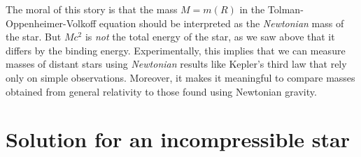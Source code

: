 The moral of this story is that the mass $M = m(R)$ in the Tolman-Oppenheimer-Volkoff equation should be interpreted as the \emph{Newtonian} mass of the star.
But $M c^2$ is \emph{not} the total energy of the star, as we saw above that it differs by the binding energy.
Experimentally, this implies that we can measure masses of distant stars using \emph{Newtonian} results like Kepler's third law that rely only on simple observations.
Moreover, it makes it meaningful to compare masses obtained from general relativity to those found using Newtonian gravity.
\section{Solution for an incompressible star}
\label{sec:incompressible_star}


